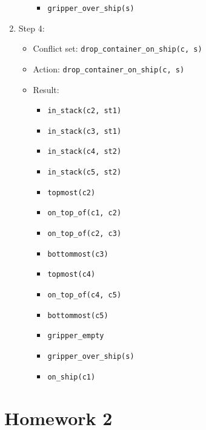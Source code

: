 \documentclass[12pt]{article}
\begin{document}
\begin{enumerate}
\begin{itemize}
\begin{itemize}
          \item \texttt{gripper\_over\_ship(s)}
        \end{itemize}
    \end{itemize}
  \item Step 4:
    \begin{itemize}
      \item Conflict set: \texttt{drop\_container\_on\_ship(c, s)}
      \item Action: \texttt{drop\_container\_on\_ship(c, s)}
      \item Result:
        \begin{itemize}
          \item \texttt{in\_stack(c2, st1)}
          \item \texttt{in\_stack(c3, st1)}
          \item \texttt{in\_stack(c4, st2)}
          \item \texttt{in\_stack(c5, st2)}
          \item \texttt{topmost(c2)}
          \item \texttt{on\_top\_of(c1, c2)}
          \item \texttt{on\_top\_of(c2, c3)}
          \item \texttt{bottommost(c3)}
          \item \texttt{topmost(c4)}
          \item \texttt{on\_top\_of(c4, c5)}
          \item \texttt{bottommost(c5)}
          \item \texttt{gripper\_empty}
          \item \texttt{gripper\_over\_ship(s)}
          \item \texttt{on\_ship(c1)}
        \end{itemize}
    \end{itemize}
\end{enumerate}
 

\newpage
\section{Homework 2}
\end{document}
